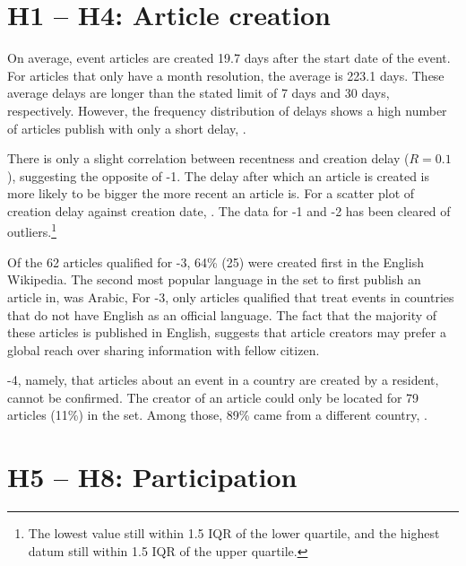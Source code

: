 
\section{H1 -- H4: Article creation}

On average, event articles are created 19.7 days after the start date of the event.
For articles that only have a month resolution, the average  is 223.1 days.
These average delays are longer than the stated limit of 7 days and 30 days, respectively.
However, the frequency distribution of delays shows a high number of articles publish with only a short delay, . 


There is only a slight correlation between recentness and creation delay ($R = 0.1$), suggesting the opposite of \hyp{1}.
 The delay after which an article is created is more likely to be bigger the more recent an article is.
For a scatter plot of  creation delay against creation date, .
The data for \hyp{1} and \hyp{2} has been cleared of outliers.\footnote{The lowest value still within 1.5 \ac{IQR} of the lower quartile, and the highest datum still within 1.5 \ac{IQR} of the upper quartile.}


Of the 62 articles qualified for \hyp{3}, 64\% (25) were created first in the English Wikipedia.  
The second most popular language in the set to first publish an article in, was Arabic, 
For \hyp{3}, only articles qualified that treat events in countries that do not have English as an official language. 
The fact that the majority of these articles is published in English, suggests that article creators may prefer a global reach over sharing information with fellow citizen.


\hyp{4}, namely, that articles about an event in a country are created by a resident, cannot be confirmed. 
The creator of an article could only be located for 79 articles (11\%) in the set. 
Among those, 89\% came from a different country, .


\section{H5 -- H8: Participation}

